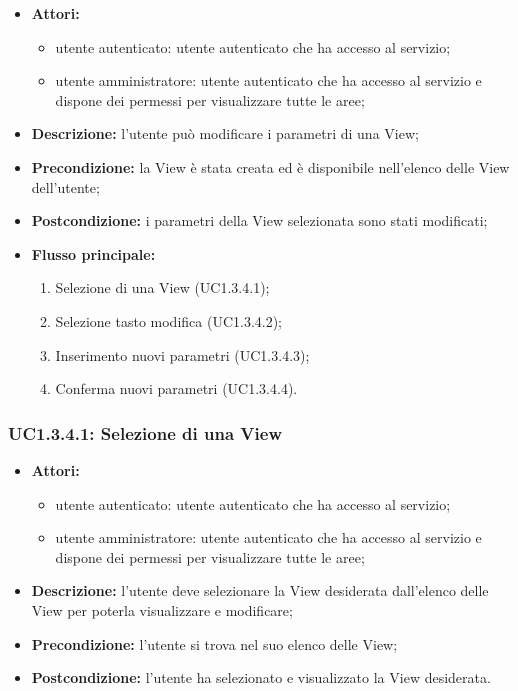 \begin{itemize}
   	\item \textbf{Attori:}
    \begin{itemize}
    	\item utente autenticato: utente autenticato che ha accesso al servizio;
    	\item utente amministratore: utente autenticato che ha accesso al servizio e dispone dei permessi per visualizzare tutte le aree;
	\end{itemize}
    \item \textbf{Descrizione:} l'utente può modificare i parametri di una View;
    \item \textbf{Precondizione:} la View è stata creata ed è disponibile nell'elenco delle View dell'utente;
    \item \textbf{Postcondizione:} i parametri della View selezionata sono stati modificati;

	\item \textbf{Flusso principale:}

    \begin{enumerate}
        \item Selezione di una View (UC1.3.4.1);
        \item Selezione tasto modifica (UC1.3.4.2);
        \item Inserimento nuovi parametri (UC1.3.4.3);
        \item Conferma nuovi parametri (UC1.3.4.4).
    \end{enumerate}

\end{itemize}

\subsubsection{UC1.3.4.1: Selezione di una View}

\begin{itemize}
    \item \textbf{Attori:}
    \begin{itemize}
    	\item utente autenticato: utente autenticato che ha accesso al servizio;
    	\item utente amministratore: utente autenticato che ha accesso al servizio e dispone dei permessi per visualizzare tutte le aree;
	\end{itemize}
    \item \textbf{Descrizione:} l'utente deve selezionare la View desiderata dall'elenco delle View per poterla visualizzare e modificare;
    \item \textbf{Precondizione:} l'utente si trova nel suo elenco delle View;
    \item \textbf{Postcondizione:} l'utente ha selezionato e visualizzato la View desiderata.
\end{itemize}

